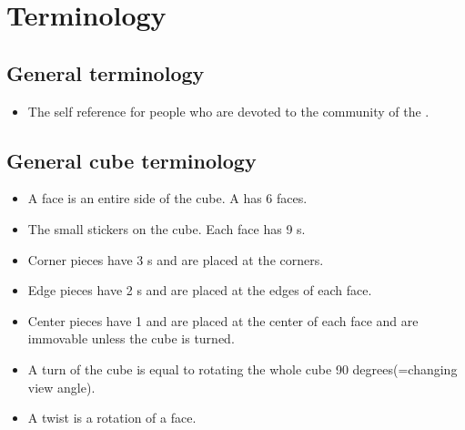 \chapter{Terminology}


\section{General terminology}
\begin{itemize}
\item {}The self reference for people who are devoted to the community of the \rubik{}. 
\end{itemize}

\section{General cube terminology}
\begin{itemize}
\item {}A face is an entire side of the cube. A \rubik{} has 6 faces.
\item {}The small stickers on the cube. Each face has 9 \facet{}s.
\item {}Corner pieces have 3 \facet{}s and are placed at the corners. 
\item {}Edge pieces have 2 \facet{}s and are placed at the edges of each face. 
\item {}Center pieces have 1 \facet{} and are placed at the center of each face and are immovable unless the cube is turned. 
\item {}A turn of the cube is equal to rotating the whole cube 90 degrees(=changing view angle).
\item {}A twist is a rotation of a face.%
\end{itemize}


